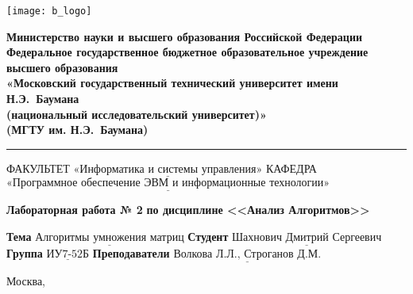 \thispagestyle{empty}

\noindent \begin{minipage}{0.15\textwidth}
	\texttt{[image: b\_logo]}
\end{minipage}
\noindent\begin{minipage}{0.85\textwidth}\centering
	\textbf{Министерство науки и высшего образования Российской Федерации}\\
	\textbf{Федеральное государственное бюджетное образовательное учреждение высшего образования}\\
	\textbf{«Московский государственный технический университет имени Н.Э.~Баумана}\\
	\textbf{(национальный исследовательский университет)»}\\
	\textbf{(МГТУ им. Н.Э.~Баумана)}
\end{minipage}

\noindent\rule{\linewidth}{3pt}
\newline\newline
\noindent ФАКУЛЬТЕТ $\underline{\text{«Информатика и системы управления»}}$ \newline\newline
\noindent КАФЕДРА $\underline{\text{«Программное обеспечение ЭВМ и информационные технологии»}}$

\vspace{1cm}

\begin{minipage}{\textwidth}
		\centering
		\Large\textbf{Лабораторная работа № 2}\newline
		\textbf{по дисциплине <<Анализ Алгоритмов>>}\newline\newline
\end{minipage}

\noindent\textbf{Тема} $\underline{\text{Алгоритмы умножения матриц}}$\newline\newline
\noindent\textbf{Студент} $\underline{\text{Шахнович Дмитрий Сергеевич}}$\newline\newline
\noindent\textbf{Группа} $\underline{\text{ИУ7-52Б}}$\newline\newline
\noindent\textbf{Преподаватели} $\underline{\text{Волкова Л.Л., Строганов Д.М.}}$\newline

\begin{center}
	\vfill
	Москва,~\the\year
\end{center}
\clearpage
